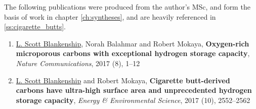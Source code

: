 The following publications were produced from the author's MSc, and form the basis of work in chapter \ref{ch:syntheses}, and are heavily referenced in \ref{ss:cigarette_butts}.

\begin{enumerate}[resume, label=\Roman*]
    \item \underline{L. Scott Blankenship}, Norah Balahmar and Robert Mokaya, \textbf{Oxygen-rich microporous carbons with exceptional hydrogen storage capacity}, \textit{Nature Communications}, 2017 (8), 1–12
    \item \underline{L. Scott Blankenship} and Robert Mokaya, \textbf{Cigarette butt-derived carbons have ultra-high surface area and unprecedented hydrogen storage capacity}, \textit{Energy \& Environmental Science}, 2017 (10), 2552–2562
    
\end{enumerate}
